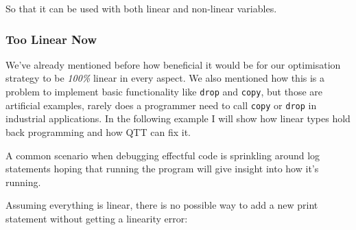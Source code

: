 \documentclass[
]{article}
\newenvironment{Shaded}{}{}
\newcommand{\DataTypeTok}[1]{\textcolor[rgb]{0.56,0.13,0.00}{#1}}
\newcommand{\DecValTok}[1]{\textcolor[rgb]{0.25,0.63,0.44}{#1}}
\newcommand{\FunctionTok}[1]{\textcolor[rgb]{0.02,0.16,0.49}{#1}}
\newcommand{\KeywordTok}[1]{\textcolor[rgb]{0.00,0.44,0.13}{\textbf{#1}}}
\newcommand{\NormalTok}[1]{#1}
\newcommand{\OperatorTok}[1]{\textcolor[rgb]{0.40,0.40,0.40}{#1}}
\newcommand{\OtherTok}[1]{\textcolor[rgb]{0.00,0.44,0.13}{#1}}
\newcommand{\StringTok}[1]{\textcolor[rgb]{0.25,0.44,0.63}{#1}}
\begin{document}
So that it can be used with both linear and non-linear variables.

\hypertarget{too-linear-now}{%
\subsubsection{Too Linear Now}\label{too-linear-now}}

We've already mentioned before how beneficial it would be for our
optimisation strategy to be \emph{100\%} linear in every aspect. We also
mentioned how this is a problem to implement basic functionality like
\texttt{drop} and \texttt{copy}, but those are artificial examples,
rarely does a programmer need to call \texttt{copy} or \texttt{drop} in
industrial applications. In the following example I will show how linear
types hold back programming and how QTT can fix it.

A common scenario when debugging effectful code is sprinkling around log
statements hoping that running the program will give insight into how
it's running.

\begin{Shaded}
\end{Shaded}

Assuming everything is linear, there is no possible way to add a new
print statement without getting a linearity error:
\end{document}
